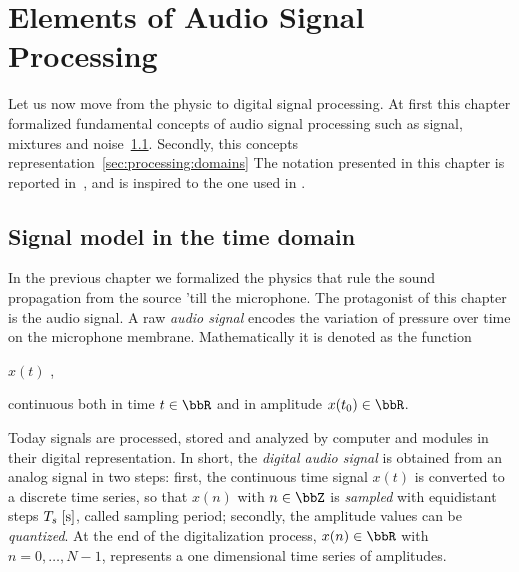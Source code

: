 \chapter{Elements of Audio Signal Processing}\label{ch:processing}
\vspace{-2.5em}
 Let us now move from the physic to digital signal processing.
At first this chapter formalized fundamental concepts of audio signal processing such as signal, mixtures and noise~\cref{sec:processing:model}.
Secondly, this concepts representation~\cref{sec:processing:domains}
The notation presented in this chapter is reported in~, and is inspired to the one used in .


\section{Signal model in the time domain}\label{sec:processing:model}
In the previous chapter we formalized the physics that rule the sound propagation from the source 'till the microphone.
The protagonist of this chapter is the audio signal.
A raw \textit{audio signal} encodes the variation of pressure over time on the microphone membrane.
Mathematically it is denoted as the function
\begin{center}
    $x(t)$
    ,
\end{center}
continuous both in time $t \in \R$ and in amplitude $x(t_0) \in \R$.

Today signals are processed, stored and analyzed by computer and modules in their digital representation.
In short, the \textit{digital audio signal} is obtained from an analog signal in two steps:
first, the continuous time signal $x(t)$ is converted to a discrete time series,
so that $x(n)$ with $n \in \Z$ is \textit{sampled}  with equidistant steps $T_s\;[\si{\second}]$, called sampling period;
secondly, the amplitude values can be \textit{quantized}.
At the end of the digitalization process, $x(n) \in \R$ with $n = 0, \dots, N-1$, represents a one dimensional time series of amplitudes.

